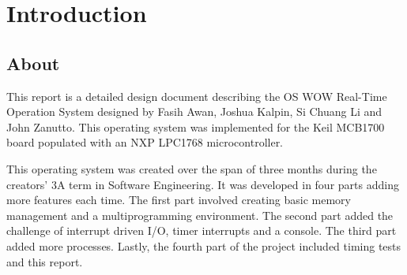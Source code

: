 \documentclass[se]{uw-wkrpt}
\begin{document}
\frontmatter


\setcounter{tocdepth}{1}

\tableofcontents

\mainmatter

\section{Introduction}\label{sec:intro}

\subsection{About}

This report is a detailed design document describing the OS WOW Real-Time Operation System designed by Fasih Awan, Joshua Kalpin, Si Chuang Li and John Zanutto. This operating system was implemented for the Keil MCB1700 board populated with an NXP LPC1768 microcontroller. 

This operating system was created over the span of three months during the creators' 3A term in Software Engineering. It was developed in four parts adding more features each time. The first part involved creating basic memory management and a multiprogramming environment. The second part added the challenge of interrupt driven I/O, timer interrupts and a console. The third part added more processes. Lastly, the fourth part of the project included timing tests and this report.
\end{document}
